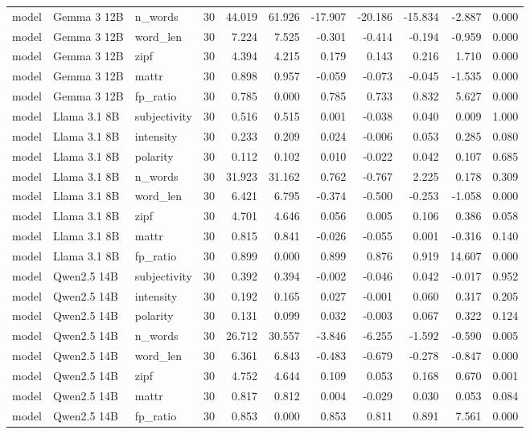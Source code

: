 \documentclass[10pt]{article}
\begin{document}
{\begin{longtable}{lllrrrrrrrr}
model & Gemma 3 12B & n\_words & 30 & 44.019 & 61.926 & -17.907 & -20.186 & -15.834 & -2.887 & 0.000 \\
model & Gemma 3 12B & word\_len & 30 & 7.224 & 7.525 & -0.301 & -0.414 & -0.194 & -0.959 & 0.000 \\
model & Gemma 3 12B & zipf & 30 & 4.394 & 4.215 & 0.179 & 0.143 & 0.216 & 1.710 & 0.000 \\
model & Gemma 3 12B & mattr & 30 & 0.898 & 0.957 & -0.059 & -0.073 & -0.045 & -1.535 & 0.000 \\
model & Gemma 3 12B & fp\_ratio & 30 & 0.785 & 0.000 & 0.785 & 0.733 & 0.832 & 5.627 & 0.000 \\
model & Llama 3.1 8B & subjectivity & 30 & 0.516 & 0.515 & 0.001 & -0.038 & 0.040 & 0.009 & 1.000 \\
model & Llama 3.1 8B & intensity & 30 & 0.233 & 0.209 & 0.024 & -0.006 & 0.053 & 0.285 & 0.080 \\
model & Llama 3.1 8B & polarity & 30 & 0.112 & 0.102 & 0.010 & -0.022 & 0.042 & 0.107 & 0.685 \\
model & Llama 3.1 8B & n\_words & 30 & 31.923 & 31.162 & 0.762 & -0.767 & 2.225 & 0.178 & 0.309 \\
model & Llama 3.1 8B & word\_len & 30 & 6.421 & 6.795 & -0.374 & -0.500 & -0.253 & -1.058 & 0.000 \\
model & Llama 3.1 8B & zipf & 30 & 4.701 & 4.646 & 0.056 & 0.005 & 0.106 & 0.386 & 0.058 \\
model & Llama 3.1 8B & mattr & 30 & 0.815 & 0.841 & -0.026 & -0.055 & 0.001 & -0.316 & 0.140 \\
model & Llama 3.1 8B & fp\_ratio & 30 & 0.899 & 0.000 & 0.899 & 0.876 & 0.919 & 14.607 & 0.000 \\
model & Qwen2.5 14B & subjectivity & 30 & 0.392 & 0.394 & -0.002 & -0.046 & 0.042 & -0.017 & 0.952 \\
model & Qwen2.5 14B & intensity & 30 & 0.192 & 0.165 & 0.027 & -0.001 & 0.060 & 0.317 & 0.205 \\
model & Qwen2.5 14B & polarity & 30 & 0.131 & 0.099 & 0.032 & -0.003 & 0.067 & 0.322 & 0.124 \\
model & Qwen2.5 14B & n\_words & 30 & 26.712 & 30.557 & -3.846 & -6.255 & -1.592 & -0.590 & 0.005 \\
model & Qwen2.5 14B & word\_len & 30 & 6.361 & 6.843 & -0.483 & -0.679 & -0.278 & -0.847 & 0.000 \\
model & Qwen2.5 14B & zipf & 30 & 4.752 & 4.644 & 0.109 & 0.053 & 0.168 & 0.670 & 0.001 \\
model & Qwen2.5 14B & mattr & 30 & 0.817 & 0.812 & 0.004 & -0.029 & 0.030 & 0.053 & 0.084 \\
model & Qwen2.5 14B & fp\_ratio & 30 & 0.853 & 0.000 & 0.853 & 0.811 & 0.891 & 7.561 & 0.000 \\
\bottomrule
\end{longtable}
}
\end{document}
